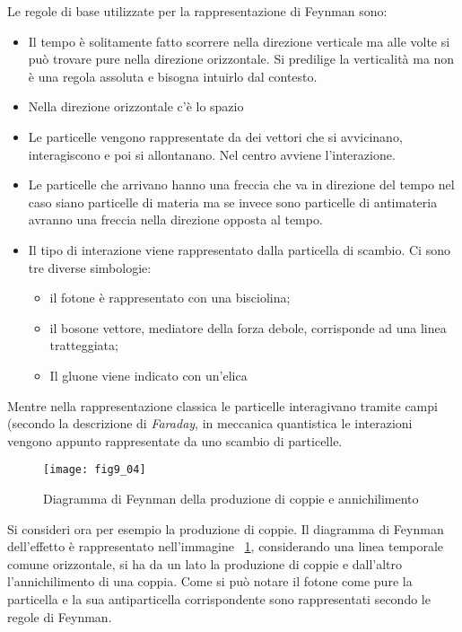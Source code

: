 Le regole di base utilizzate per la rappresentazione di Feynman sono:
\begin{itemize}
\item Il tempo è solitamente fatto scorrere nella direzione verticale ma alle volte si può trovare pure nella direzione orizzontale.
Si predilige la verticalità ma non è una regola assoluta e bisogna intuirlo dal contesto.
\item Nella direzione orizzontale c'è lo spazio
\item Le particelle vengono rappresentate da dei vettori che si avvicinano, interagiscono e poi si allontanano.
Nel centro avviene l'interazione.
\item Le particelle che arrivano hanno una freccia che va in direzione del tempo nel caso siano particelle di materia ma se invece sono particelle di antimateria avranno una freccia nella direzione opposta al tempo.
\item Il tipo di interazione viene rappresentato dalla particella di scambio. 
Ci sono tre diverse simbologie:
\begin{itemize}
\item il fotone è rappresentato con una bisciolina;
\item il bosone vettore, mediatore della forza debole, corrisponde ad una linea tratteggiata;
\item Il gluone viene indicato con un'elica
\end{itemize}
\end{itemize}
Mentre nella rappresentazione classica le particelle interagivano tramite campi (secondo la descrizione di \emph{Faraday}, in meccanica quantistica le interazioni vengono appunto rappresentate da uno scambio di particelle.

\begin{figure}[h]
\centering
\texttt{[image: fig9\_04]}
\caption{Diagramma di Feynman della produzione di coppie e annichilimento}
\label{MD:9.04}
\end{figure}
Si consideri ora per esempio la produzione di coppie.
Il diagramma di Feynman dell'effetto è rappresentato nell'immagine ~\ref{MD:9.04}, considerando una linea temporale comune orizzontale, si ha da un lato la produzione di coppie e dall'altro l'annichilimento di una coppia.
Come si può notare il fotone come pure la particella e la sua antiparticella corrispondente  sono rappresentati secondo le regole di Feynman.

